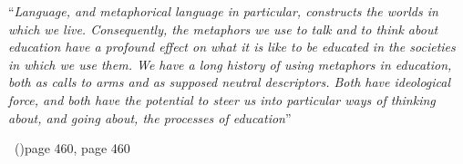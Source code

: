 \documentclass[
12pt, %
oneside, %
english, %
onehalfspacing,
headsepline, %
]{MastersDoctoralThesis} %
\newcommand\mycite[2][]{\citeauthor{#2}\ (\citeyear{#2})\ifx#1\undefined\else, #1\fi}
\begin{document}
\rule{0mm}{30mm}
\noindent\begin{singlespace}\enquote{\itshape Language, and
  metaphorical language in particular, constructs the worlds in which
  we live. Consequently, the metaphors we use to talk and to think
  about education have a profound effect on what it is like to be
  educated in the societies in which we use them.  We have a long
  history of using metaphors in education, both as calls to arms and
  as supposed neutral descriptors.  Both have ideological force, and
  both have the potential to steer us into particular ways of thinking
  about, and going about, the processes of
  education}\bigbreak\end{singlespace}
\hfill\mycite[page 460]{paechter2004}











\pagestyle{thesis} %



\end{document}
